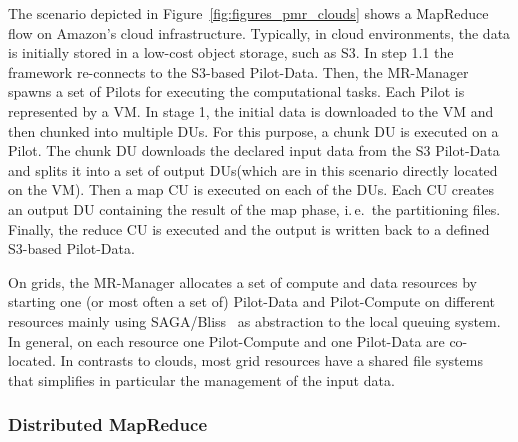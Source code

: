 \documentclass[times]{cpeauth}
\newcommand{\pilot}{Pilot\xspace}
\newcommand{\pilots}{Pilots\xspace}
\newcommand{\pilotcompute}{Pilot-Compute\xspace}
\newcommand{\pilotdata}{Pilot-Data\xspace}
\newcommand{\mrmg}{MR-Manager\xspace}
\newcommand{\du}{DU\xspace}
\newcommand{\dus}{DUs\xspace}
\newcommand{\cu}{CU\xspace}
\begin{document}
The scenario depicted in Figure~\ref{fig:figures_pmr_clouds} shows a MapReduce
flow on Amazon's cloud infrastructure. Typically, in cloud environments, the
data is initially stored in a low-cost object storage, such as S3. In step 1.1
the framework re-connects to the S3-based \pilotdata. Then, the \mrmg spawns a
set of \pilots for executing the computational tasks. Each \pilot is
represented by a VM. In stage 1, the initial data is downloaded to the VM and
then chunked into multiple \dus. For this purpose, a chunk \du is executed on
a \pilot. The chunk \du downloads the declared input data from the S3
\pilotdata and splits it into a set of output \dus (which are in this scenario
directly located on the VM). Then a map \cu is executed on each of the \dus.
Each \cu creates an output \du containing the result of the map phase, i.\,e.\
the partitioning files. Finally, the reduce \cu is executed and the output is
written back to a defined S3-based \pilotdata.


On grids, the \mrmg allocates a set of compute and data resources by starting
one (or most often a set of) \pilotdata and \pilotcompute on different
resources mainly using SAGA/Bliss~\cite{saga-bliss-pd} as abstraction to the
local queuing system. In general, on each resource one \pilotcompute and one
\pilotdata are co-located. In contrasts to clouds, most grid resources have a
shared file systems that simplifies in particular the management of the input
data.




\subsubsection*{Distributed MapReduce}
\end{document}
